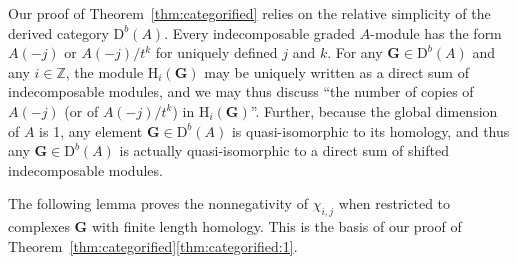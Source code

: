 \documentclass[12pt]{amsart}
\theoremstyle{definition}
\theoremstyle{remark}
\newcommand{\HH}{\mathrm{H}}
\newcommand{\ZZ}{\mathbb{Z}}
\newcommand{\QQ}{\mathbb{Q}}
\newcommand{\Gbull}{\mathbf{G}}
\newcommand{\DD}{\mathrm{D}}
\begin{document}
%

Our proof of Theorem~\ref{thm:categorified} relies on the relative simplicity of the derived category $\DD^b(A)$.  Every indecomposable graded $A$-module has the form $A(-j)$ or $A(-j)/t^k$ for uniquely defined $j$ and $k$.  For any $\Gbull\in \DD^b(A)$ and any $i\in \ZZ$, the module $\HH_i(\Gbull)$ may be uniquely written as a direct sum of indecomposable modules, and we may thus discuss ``the number of copies of $A(-j)$ (or of $A(-j)/t^k$) in $\HH_i(\Gbull)$''. Further, because the global dimension of $A$ is 1, any element $\Gbull\in \DD^b(A)$ is quasi-isomorphic to its homology, and thus any $\Gbull\in \DD^b(A)$ is actually quasi-isomorphic to a direct sum of shifted indecomposable modules.

The following lemma proves the nonnegativity of $\chi_{i,j}$ when restricted to complexes $\Gbull$ with finite length homology.  This is the basis of our proof of Theorem~\ref{thm:categorified}\eqref{thm:categorified:1}.
\end{document}
